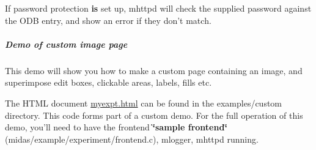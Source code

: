 If password protection {\bfseries is} set up, mhttpd will check the supplied password against the ODB entry, and show an error if they don't match.

\label{index_end}
\hypertarget{index_end}{}


 \subparagraph{Demo of custom image page}\label{RC_mhttpd_custom_demo}
\par




\par


This demo will show you how to make a custom page containing an image, and superimpose edit boxes, clickable areas, labels, fills etc.

The HTML document \hyperlink{myexpt_8html}{myexpt.html} can be found in the examples/custom directory. This code forms part of a custom demo. For the full operation of this demo, you'll need to have the frontend {\bfseries \char`\"{}sample frontend\char`\"{}} (midas/example/experiment/frontend.c), mlogger, mhttpd running.

